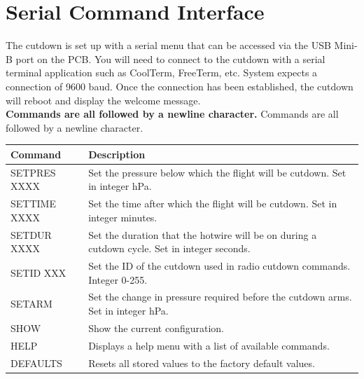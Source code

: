 \documentclass[letter,12pt,oneside,pdflatex,italian,final,twocolumn]{article}
\begin{document}
\section{Serial Command Interface}
The cutdown is set up with a serial menu that can be accessed via the USB Mini-B port on the PCB. You will need to connect to the cutdown with a serial terminal application such as CoolTerm, FreeTerm, etc. System expects a connection of 9600 baud. Once the connection has been established, the cutdown will reboot and display the welcome message.\\
\textbf{Commands are all followed by a newline character.} Commands are all followed by a newline character.
\begin{center}
\begin{tabular}{|l|l|} 
 \hline
\textbf{ Command} & \textbf{Description} \\ [0.5ex] 
 \hline\hline
SETPRES XXXX & Set the pressure below which the flight will be cutdown. Set in integer hPa. \\
\hline
SETTIME XXXX & Set the time after which the flight will be cutdown. Set in integer minutes. \\
\hline
SETDUR XXXX & Set the duration that the hotwire will be on during a cutdown cycle. Set in integer seconds. \\
\hline
SETID XXX & Set the ID of the cutdown used in radio cutdown commands. Integer 0-255. \\
\hline
SETARM & Set the change in pressure required before the cutdown arms. Set in integer hPa. \\
 \hline
 SHOW & Show the current configuration. \\
 \hline
  HELP & Displays a help menu with a list of available commands. \\
 \hline
 DEFAULTS & Resets all stored values to the factory default values. \\
 \hline
\end{tabular}
\end{center}
\end{document}
